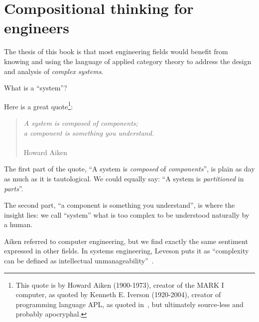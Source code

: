 
\section[Compositionality for engineers]{Compositional thinking for engineers}
\label{sec:compositionality-for-engineers}

The thesis of this book is that most engineering fields would benefit from knowing and using the language of applied category theory to address the design and analysis of \emph{complex systems}.


\label{subsec:introduction-systems-and-components}

What is a ``system''?

Here is a great quote\footnote{
    This quote is by Howard Aiken (1900-1973), creator of the MARK I computer,
    as quoted by Kenneth E.
    Iverson (1920-2004), creator of programming language APL,
    as quoted in~\cite{McIntyre1999Role}, but ultimately source-less and probably apocryphal.
}:

\begin{quote}
    \emph{A system is composed of components; \\
        a component is something you understand.}\\ \\
    Howard Aiken
\end{quote}

The first part of the quote, ``A system is \emph{composed} of \emph{components}'', is plain as day as much as it is tautological.
We could equally say: ``A system is \emph{partitioned} in \emph{parts}''.

The second part, ``a component is something you understand'', is where the insight lies: we call ``system'' what is too complex to be understood naturally by a human.

Aiken referred to computer engineering, but we find exactly the same sentiment expressed in other fields.
In systems engineering, Leveson puts it as ``complexity can be defined as intellectual unmanageability''~\cite{leveson12engineering}.

